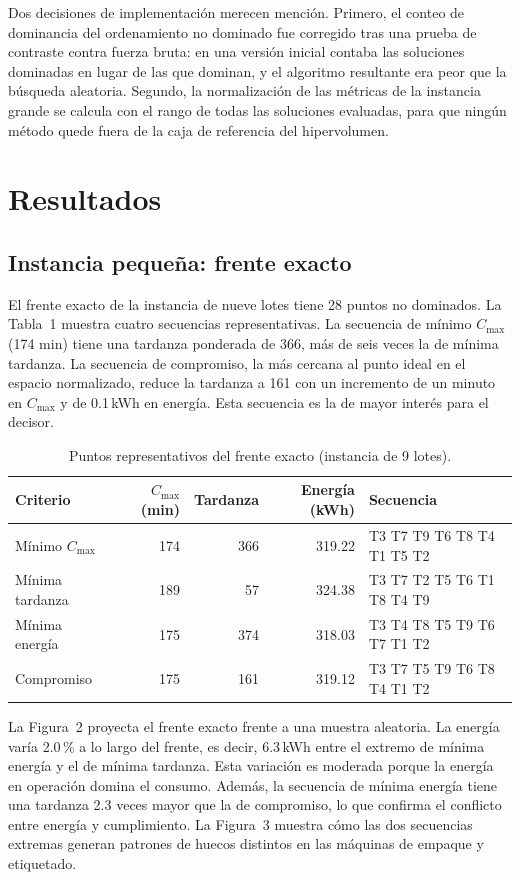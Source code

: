 \documentclass[11pt,a4paper]{article}
\begin{document}
Dos decisiones de implementación merecen mención. Primero, el conteo de dominancia del ordenamiento no dominado fue corregido tras una prueba de contraste contra fuerza bruta: en una versión inicial contaba las soluciones dominadas en lugar de las que dominan, y el algoritmo resultante era peor que la búsqueda aleatoria. Segundo, la normalización de las métricas de la instancia grande se calcula con el rango de todas las soluciones evaluadas, para que ningún método quede fuera de la caja de referencia del hipervolumen.

\section{Resultados}
\subsection{Instancia pequeña: frente exacto}
El frente exacto de la instancia de nueve lotes tiene 28 puntos no dominados. La Tabla~1 muestra cuatro secuencias representativas. La secuencia de mínimo $C_{\max}$ (174 min) tiene una tardanza ponderada de 366, más de seis veces la de mínima tardanza. La secuencia de compromiso, la más cercana al punto ideal en el espacio normalizado, reduce la tardanza a 161 con un incremento de un minuto en $C_{\max}$ y de 0.1\,kWh en energía. Esta secuencia es la de mayor interés para el decisor.

\begin{table}[t]
\centering
\caption{Puntos representativos del frente exacto (instancia de 9 lotes).}
\label{tab:decision}
\begin{tabular}{@{}lrrrl@{}}
\toprule
Criterio & $C_{\max}$ (min) & Tardanza & Energía (kWh) & Secuencia \\
\midrule
Mínimo $C_{\max}$ & 174 & 366 & 319.22 & T3 T7 T9 T6 T8 T4 T1 T5 T2 \\
Mínima tardanza & 189 & 57 & 324.38 & T3 T7 T2 T5 T6 T1 T8 T4 T9 \\
Mínima energía & 175 & 374 & 318.03 & T3 T4 T8 T5 T9 T6 T7 T1 T2 \\
Compromiso & 175 & 161 & 319.12 & T3 T7 T5 T9 T6 T8 T4 T1 T2 \\
\bottomrule
\end{tabular}
\end{table}

La Figura~2 proyecta el frente exacto frente a una muestra aleatoria. La energía varía 2.0\,\% a lo largo del frente, es decir, 6.3\,kWh entre el extremo de mínima energía y el de mínima tardanza. Esta variación es moderada porque la energía en operación domina el consumo. Además, la secuencia de mínima energía tiene una tardanza 2.3 veces mayor que la de compromiso, lo que confirma el conflicto entre energía y cumplimiento. La Figura~3 muestra cómo las dos secuencias extremas generan patrones de huecos distintos en las máquinas de empaque y etiquetado.
\end{document}

